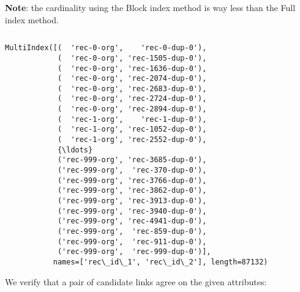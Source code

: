 \documentclass{article}
\begin{document}
    \textbf{Note}: the cardinality using the Block index method is way less
than the Full index method.

    \begin{Verbatim}[commandchars=\\\{\}]

\end{Verbatim}
\begin{Verbatim}[commandchars=\\\{\}]
MultiIndex([(  'rec-0-org',    'rec-0-dup-0'),
            (  'rec-0-org', 'rec-1505-dup-0'),
            (  'rec-0-org', 'rec-1636-dup-0'),
            (  'rec-0-org', 'rec-2074-dup-0'),
            (  'rec-0-org', 'rec-2683-dup-0'),
            (  'rec-0-org', 'rec-2724-dup-0'),
            (  'rec-0-org', 'rec-2894-dup-0'),
            (  'rec-1-org',    'rec-1-dup-0'),
            (  'rec-1-org', 'rec-1052-dup-0'),
            (  'rec-1-org', 'rec-2552-dup-0'),
            {\ldots}
            ('rec-999-org', 'rec-3685-dup-0'),
            ('rec-999-org',  'rec-370-dup-0'),
            ('rec-999-org', 'rec-3766-dup-0'),
            ('rec-999-org', 'rec-3862-dup-0'),
            ('rec-999-org', 'rec-3913-dup-0'),
            ('rec-999-org', 'rec-3940-dup-0'),
            ('rec-999-org', 'rec-4941-dup-0'),
            ('rec-999-org',  'rec-859-dup-0'),
            ('rec-999-org',  'rec-911-dup-0'),
            ('rec-999-org',  'rec-999-dup-0')],
           names=['rec\_id\_1', 'rec\_id\_2'], length=87132)
\end{Verbatim}
    We verify that a pair of candidate links agree on the given attributes:
\end{document}
